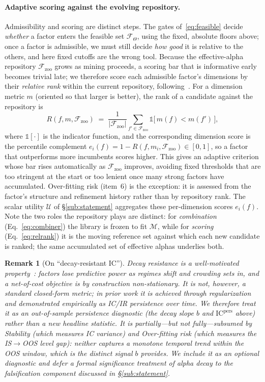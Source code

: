 \documentclass[11pt]{article}
\newtheorem{remark}{Remark}
\newcommand{\Fspace}{\mathcal{F}}
\newcommand{\proto}{\Theta}
\newcommand{\feasible}{\Fspace_{\proto}}
\newcommand{\zoo}{\Fspace_{\mathrm{zoo}}}
\newcommand{\combiner}{\mathcal{M}}
\begin{document}
\paragraph{Adaptive scoring against the evolving repository.}
Admissibility and scoring are distinct steps. The gates of~\eqref{eq:feasible} decide
\emph{whether} a factor enters the feasible set $\feasible$, using the fixed, absolute
floors above; once a factor is admissible, we must still decide \emph{how good} it is
relative to the others, and here fixed cutoffs are the wrong tool. Because the
effective-alpha repository $\zoo$ grows as mining proceeds, a scoring bar that is
informative early becomes trivial late; we therefore score each admissible factor's
dimensions by their \emph{relative rank} within the current repository,
following~\cite{shi2025alphajungle}.
For a dimension metric $m$ (oriented so that larger is better), the rank of a candidate
against the repository is
\begin{equation}
  R(f, m, \zoo) \;=\; \frac{1}{|\zoo|}\sum_{f'\in\zoo}\mathbb{1}\!\big[\,m(f) < m(f')\,\big],
  \label{eq:relrank}
\end{equation}
where $\mathbb{1}[\cdot]$ is the indicator function, and the corresponding dimension
score is the percentile complement $e_i(f)=1-R(f,m_i,\zoo)\in[0,1]$, so a factor that
outperforms more incumbents scores higher. This gives an adaptive criterion whose bar
rises automatically as $\zoo$ improves, avoiding fixed thresholds that are too stringent
at the start or too lenient once many strong factors have accumulated. Over-fitting risk
(item~6) is the exception: it is assessed from the factor's structure and refinement
history rather than by repository rank. The scalar utility $\mathcal{U}$ of
\S\ref{sub:statement} aggregates these per-dimension scores $e_i(f)$. Note the two roles
the repository plays are distinct: for \emph{combination} (Eq.~\eqref{eq:combiner}) the
library is frozen to fit $\combiner$, while for \emph{scoring} (Eq.~\eqref{eq:relrank})
it is the moving reference set against which each new candidate is ranked; the same
accumulated set of effective alphas underlies both.

\begin{remark}[On ``decay-resistant IC'']
\label{rem:decay}
Decay resistance is a well-motivated \emph{property}~\cite{tang2025alphaagent}: factors
lose predictive power as regimes shift and crowding sets in, and a net-of-cost objective
is by construction non-stationary. It is not, however, a standard closed-form metric;
in prior work it is achieved through regularization and demonstrated \emph{empirically}
as IC/IR persistence over time. We therefore treat it as an out-of-sample persistence
diagnostic (the decay slope $b$ and $\mathrm{IC}^{\mathrm{pers}}$ above) rather than a
new headline statistic. It is partially---but not fully---subsumed by Stability
(which measures IC \emph{variance}) and Over-fitting risk (which measures the IS$\to$OOS
\emph{level gap}): neither captures a monotone \emph{temporal trend} within the OOS
window, which is the distinct signal $b$ provides. We include it as an optional
diagnostic and defer a formal significance treatment of alpha decay to the falsification
component discussed in \S\ref{sub:statement}.
\end{remark}
\end{document}
